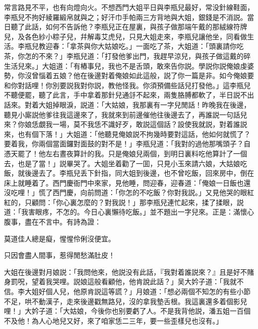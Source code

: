 常言路見不平，也有向燈向火。不想西門大姐平日與李瓶兒最好，常没針線鞋面，李瓶兒不拘好綾羅緞帛就與之；好汗巾手帕兩三方背地與大姐，銀錢是不消説。當日聽了此話，如何不告訴他？李瓶兒正在屋裏，與孩子做那端午戴的那絨線符牌兒，及各色紗小粽子兒，幷解毒艾虎兒，只見大姐走來，李瓶兒讓他坐，同看做生活。李瓶兒教迎春：「拿茶與你大姑娘吃。」一面吃了茶，大姐道：「頭裏請你吃茶，你怎的不來？」李瓶兒道：「打發他爹出門，我趕早涼兒，與孩子做這戴的碎生活兒來。」大姐道：「有樁事兒，我也不是舌頭，敢來告你説。學説你説俺娘虔婆勢，你沒曾惱着五娘？他在後邊對着俺娘如此這般，説了你一篇是非。如今俺娘要和你對話哩！你別要説我對你説，教他怪我。你須預備些話兒打發他。」這李瓶兒不聽便罷，聽了此言，手中拿着那針兒通㧱不起來，兩隻胳膊都軟了，半日説不出話來。對着大姐掉眼淚，説道：「大姑娘，我那裏有一字兒閒話！昨晚我在後邊，聽見小廝説他爹往我這邊來了，我就來到前邊催他往後邊去了，再誰説一句話兒來？你娘恁覷我一場，莫不我恁不識好歹，敢説這個話？設使我就説，對着誰説來，也有個下落！」大姐道：「他聽見俺娘説不拘幾時要對這話，他如何就慌了？要着我，你兩個當面鑼對面鼓的對不是！」李瓶兒道：「我對的過他那嘴頭子？自憑天罷了！他左右晝夜算計的我。只是俺娘兒兩個，到明日裏料吃他算計了一個去，也是了當！」説畢哭了。大姐坐着勸了一囬，只見小玉來請六娘，大姑娘吃飯，就後邊去了。李瓶兒丢下針指，同大姐到後邊，也不曾吃飯，回來房中，倒在床上就睡着了。西門慶衙門中來家，見他睡，問迎春，迎春道：「俺娘一日飯也還沒吃哩！」慌了西門慶，向前問道：「你怎的不吃飯？你對我説。」又見他哭的眼紅紅的，只顧問：「你心裏怎麼的？對我説！」那李瓶兒連忙起來，揉了揉眼，説道：「我害眼疼，不怎的。今日心裏懶待吃飯。」並不題出一字兒來。正是：滿懷心腹事，盡在不言中。有詩為證：

\begin{myquote}
莫道佳人總是癡，惺惺伶俐沒便宜。

只因會盡人間事，惹得閒愁滿肚皮！
\end{myquote}

大姐在後邊對月娘説：「我問他來，他説没有此話，『我對着誰説來？』且是好不賭身罰呪，望着我哭哩。説娘這般看顧他，他肯說此話？」吴大妗子道：「我就不信。李大姐好個人兒，他原肯説這等謊？」月娘道：「想必兩個不知怎的有些小節不足，哄不動漢子，走來後邊戳無路兒，沒的拿我墊舌根。我這裏還多着個影兒哩！」大妗子道：「大姑娘，今後你也别要虧了人。不是我背他説，潘五姐一百個不及他！為人心地兒又好，來了咱家恁二三年，要一些歪樣兒也沒有。」

